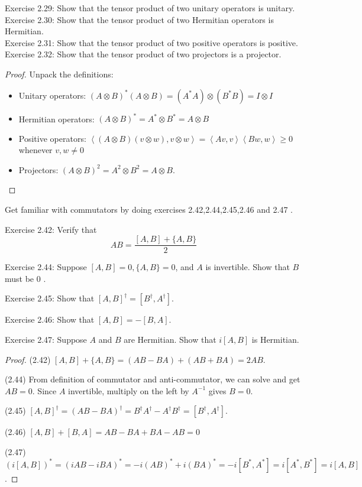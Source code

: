\begin{problem}
	Exercise 2.29: Show that the tensor product of two unitary operators is unitary.\\
Exercise 2.30: Show that the tensor product of two Hermitian operators is Hermitian.\\
Exercise 2.31: Show that the tensor product of two positive operators is positive.\\
Exercise 2.32: Show that the tensor product of two projectors is a projector.
\end{problem}
\begin{proof}
	Unpack the definitions:
	\begin{itemize}
		\item Unitary operators: $\left( A \otimes B \right)^*\left( A \otimes B \right) = (A^* A) \otimes (B^* B) = I \otimes I $
		\item Hermitian operators: $(A \otimes B)^* = A^* \otimes B^* = A \otimes B$
		\item Positive operators: $\left\langle (A \otimes B) (v \otimes w), v \otimes w \right\rangle = \left\langle Av, v \right\rangle \left\langle B w, w \right\rangle \ge 0 $ whenever $v, w \neq 0$
		\item Projectors: $\left( A \otimes B \right) ^2 = A^2 \otimes B^2 = A \otimes B$.
	\end{itemize}
\end{proof}

\begin{problem}
	Get familiar with commutators by doing exercises 2.42,2.44,2.45,2.46 and 2.47 .

	Exercise 2.42: Verify that
\[
A B=\frac{[A, B]+\{A, B\}}{2}
\]

Exercise 2.44: Suppose $[A, B]=0,\{A, B\}=0$, and $A$ is invertible. Show that $B$ must be 0 .

Exercise 2.45: Show that $[A, B]^{\dagger}=\left[B^{\dagger}, A^{\dagger}\right]$.

Exercise 2.46: Show that $[A, B]=-[B, A]$.

Exercise 2.47: Suppose $A$ and $B$ are Hermitian. Show that $i[A, B]$ is Hermitian.
\end{problem}
\begin{proof}
	(2.42) $[A, B] + \{A, B\}  = (AB - BA) + (AB + BA) = 2AB$.
	
	(2.44) From definition of commutator and anti-commutator, we can solve and get  $AB = 0$. Since $A$ invertible, multiply on the left by $A^{-1}$ gives $B = 0$.

	(2.45) $[A, B]^\dag = (AB - BA)^\dag = B^\dag A^\dag - A^\dag B^\dag = [B^\dag, A^\dag]$.

	(2.46) $[A, B] + [B, A] = AB - BA + BA - AB = 0$

	(2.47)  $\left( i[A, B] \right) ^* = \left( i AB - iBA \right) ^* = -i (AB)^* + i (BA)^* = -i [B^*, A^*] = i [A^*, B^*] = i[A, B]$.
\end{proof}

